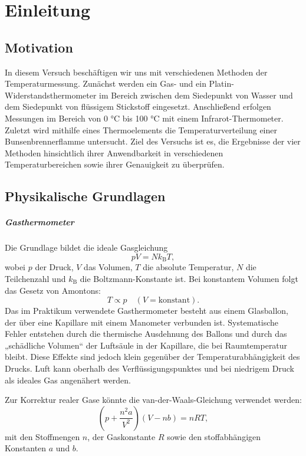 \chapter{Einleitung}


\section{Motivation}
In diesem Versuch beschäftigen wir uns mit verschiedenen Methoden der Temperaturmessung. Zunächst werden ein Gas- und ein Platin-Widerstandsthermometer im Bereich zwischen dem Siedepunkt von Wasser und dem Siedepunkt von flüssigem Stickstoff eingesetzt. Anschließend erfolgen Messungen im Bereich von 0 °C bis 100 °C mit einem Infrarot-Thermometer. Zuletzt wird mithilfe eines Thermoelements die Temperaturverteilung einer Bunsenbrennerflamme untersucht. Ziel des Versuchs ist es, die Ergebnisse der vier Methoden hinsichtlich ihrer Anwendbarkeit in verschiedenen Temperaturbereichen sowie ihrer Genauigkeit zu überprüfen.

\section{Physikalische Grundlagen}
\cite{skript25, demtroeder17}
\paragraph{Gasthermometer}
Die Grundlage bildet die ideale Gasgleichung
\begin{equation}
    pV = N k_{\mathrm{B}} T,
\end{equation}
wobei $p$ der Druck, $V$ das Volumen, $T$ die absolute Temperatur, $N$ die Teilchenzahl und $k_{\mathrm{B}}$ die Boltzmann-Konstante ist.  
Bei konstantem Volumen folgt das Gesetz von Amontons:
\begin{equation}
    T \propto p \quad (V = \text{konstant}).
\end{equation}
Das im Praktikum verwendete Gasthermometer besteht aus einem Glasballon, der über eine Kapillare mit einem Manometer verbunden ist. Systematische Fehler entstehen durch die thermische Ausdehnung des Ballons und durch das „schädliche Volumen“ der Luftsäule in der Kapillare, die bei Raumtemperatur bleibt. Diese Effekte sind jedoch klein gegenüber der Temperaturabhängigkeit des Drucks. Luft kann oberhalb des Verflüssigungspunktes und bei niedrigem Druck als ideales Gas angenähert werden.  

Zur Korrektur realer Gase könnte die van-der-Waals-Gleichung verwendet werden:
\begin{equation}
    \left(p + \frac{n^2 a}{V^2}\right)(V - nb) = nRT,
\end{equation}
mit den Stoffmengen $n$, der Gaskonstante $R$ sowie den stoffabhängigen Konstanten $a$ und $b$.

